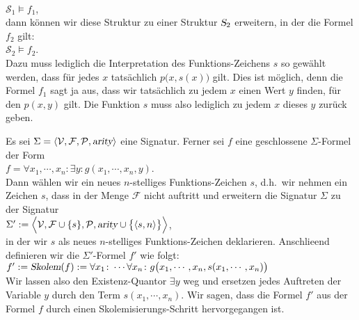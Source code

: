 \\[0.2cm]
\hspace*{1.3cm}
$\mathcal{S}_1 \models f_1$,
\\[0.2cm]
dann k\"{o}nnen wir diese Struktur zu einer Struktur $\textsl{S}_2$ erweitern, in der die
Formel $f_2$ gilt:
\\[0.2cm]
\hspace*{1.3cm}
$\mathcal{S}_2 \models f_2$.
\\[0.2cm]
Dazu muss lediglich die Interpretation des Funktions-Zeichens $s$ so gew\"{a}hlt werden, dass
f\"{u}r jedes $x$ tats\"{a}chlich $p\bigl(x,s(x)\bigr)$ gilt.  Dies ist m\"{o}glich, denn die Formel
$f_1$ sagt ja aus, dass wir tats\"{a}chlich zu jedem $x$ einen Wert $y$ finden, f\"{u}r den
$p(x,y)$ gilt.   Die Funktion $s$ muss also lediglich zu jedem $x$ dieses $y$ zur\"{u}ck geben.



\begin{Definition}[Skolemisierung]
  Es sei $\Sigma = \langle \mathcal{V}, \mathcal{F}, \mathcal{P}, \textsl{arity} \rangle$
  eine Signatur.  Ferner sei $f$ eine geschlossene $\Sigma$-Formel der Form \\[0.2cm]
  \hspace*{1.3cm} 
  $f = \forall x_1, \cdots, x_n \colon \exists y \colon g(x_1, \cdots, x_n, y)$. \\[0.2cm]
  Dann w\"{a}hlen wir ein neues $n$-stelliges Funktions-Zeichen $s$, d.h.~wir nehmen ein Zeichen $s$, dass in
  der Menge $\mathcal{F}$ nicht auftritt und erweitern die Signatur $\Sigma$ zu der Signatur \\[0.2cm]
  \hspace*{1.3cm} 
  $\Sigma' := \Bigl\langle \mathcal{V}, \mathcal{F} \cup \{s\}, \mathcal{P}, \textsl{arity} \cup \bigl\{\pair(s,n)\bigr\} \Bigr\rangle$, \\[0.2cm]
  in der wir $s$ als neues $n$-stelliges Funktions-Zeichen deklarieren.  Anschlie\3end definieren wir die $\Sigma'$-Formel
  $f'$ wie folgt: \\[0.2cm]
  \hspace*{1.3cm} 
  $f' := \textsl{Skolem}(f) := 
  \forall x_1 \colon \cdots \forall x_n \colon g\bigl(x_1, \cdots, x_n, s(x_1,\cdots,x_n)\bigr)$
  \\[0.2cm]
  Wir lassen also den Existenz-Quantor $\exists y$ weg und ersetzen jedes Auftreten
  der Variable $y$ durch den Term $s(x_1,\cdots,x_n)$.  Wir sagen, dass die Formel $f'$ aus der Formel $f$
  durch einen Skolemisierungs-Schritt hervorgegangen ist. 
  \eox
\end{Definition}

